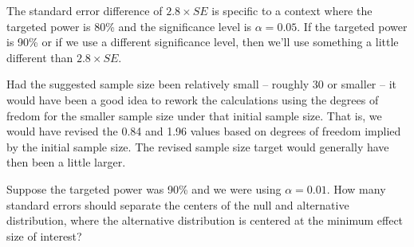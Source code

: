 The standard error difference of $2.8 \times SE$ is specific
to a context where the targeted power is 80\% and the
significance level is $\alpha = 0.05$.
If the targeted power is 90\% or if we use a different
significance level, then we'll use something a little
different than $2.8 \times SE$.

Had the suggested sample size been relatively small
-- roughly 30 or smaller -- it would have been a good idea
to rework the calculations using the degrees of fredom
for the smaller sample size under that initial sample size.
That is, we would have revised the 0.84 and 1.96
values based on degrees of freedom implied by the initial
sample size.
The revised sample size target would generally have then
been a little larger.

%

\D{\newpage}

\begin{exercisewrap}
\begin{nexercise}
Suppose the targeted power was 90\% and we were using
$\alpha = 0.01$.
How many standard errors should separate the centers
of the null and alternative distribution, where the
alternative distribution is centered at the minimum
effect size of interest?\footnotemark{}
\end{nexercise}
\end{exercisewrap}

